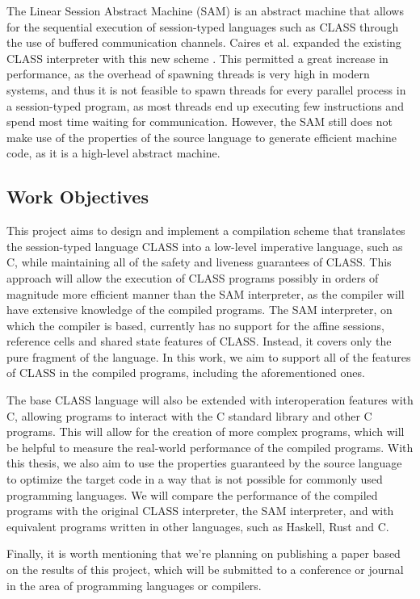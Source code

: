 The Linear Session Abstract Machine (SAM) \cite{Caires:2024} is an abstract machine that allows for the sequential execution of session-typed languages such as CLASS through the use of buffered communication channels. Caires et al. expanded the existing CLASS interpreter with this new scheme \cite{Caires:2024:artifact}. This permitted a great increase in performance, as the overhead of spawning threads is very high in modern systems, and thus it is not feasible to spawn threads for every parallel process in a session-typed program, as most threads end up executing few instructions and spend most time waiting for communication. However, the SAM still does not make use of the properties of the source language to generate efficient machine code, as it is a high-level abstract machine.

\subsection{Work Objectives}

This project aims to design and implement a compilation scheme that translates the session-typed language CLASS into a low-level imperative language, such as C, while maintaining all of the safety and liveness guarantees of CLASS. This approach will allow the execution of CLASS programs possibly in orders of magnitude more efficient manner than the SAM interpreter, as the compiler will have extensive knowledge of the compiled programs. The SAM interpreter, on which the compiler is based, currently has no support for the affine sessions, reference cells and shared state features of CLASS. Instead, it covers only the pure fragment of the language. In this work, we aim to support all of the features of CLASS in the compiled programs, including the aforementioned ones.

The base CLASS language will also be extended with interoperation features with C, allowing programs to interact with the C standard library and other C programs. This will allow for the creation of more complex programs, which will be helpful to measure the real-world performance of the compiled programs. With this thesis, we also aim to use the properties guaranteed by the source language to optimize the target code in a way that is not possible for commonly used programming languages. We will compare the performance of the compiled programs with the original CLASS interpreter, the SAM interpreter, and with equivalent programs written in other languages, such as Haskell, Rust and C.

Finally, it is worth mentioning that we're planning on publishing a paper based on the results of this project, which will be submitted to a conference or journal in the area of programming languages or compilers.
